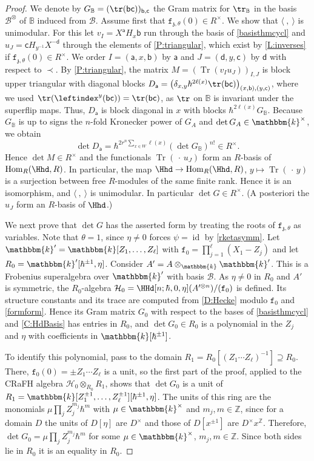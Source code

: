 \documentclass[a4paper,11pt]{amsart}
\let\<\langle
\let\>\rangle
\newcommand{\Tr}{\op{Tr}}
\newcommand\cB{\mathcal{B}}
\newcommand\cBo{\cB^{\otimes}}
\numberwithin{equation}{subsection}
\theoremstyle{definition}
\theoremstyle{theorem}
\theoremstyle{remark}
\newcommand\charge{{\mathfrak{z}}}
\newcommand\fct{\mathtt{f}_{\charge,\theta}}
\newcommand\Sym{W}
\newcommand\ba{\mathsf{a}}
\newcommand\bd{\mathsf{d}}
\newcommand\bb{\mathsf{b}}
\newcommand\bc{\mathsf{c}}
\newcommand\op{\operatorname}
\newcommand\kk{\mathbbm{k}}
\newcommand\Z{\mathbb{Z}}
\newcommand{\Bo}{\mathbb{B}}
\begin{document}
\begin{proof} We denote by $G_\Bo=(\tr(\bb\bc))_{\bb,\bc}$ the Gram matrix for $\tr_\Bo$ in the basis $\cBo$ of $\Bo$ induced from $\cB$.
Assume first that $\fct(0)\in R^{\times}$. We show that $\<\ ,\ \>$ is unimodular. For this let $v_I=X^{\ba}H_x\bb$ run
through the basis of \autoref{basisthmcycl} and $u_J=\bc H_{y^{-1}}X^{-\bd}$ through the elements
of \autoref{P:triangular}, which exist by \autoref{L:inverses} if $\fct(0)\in R^{\times}$. We order $I=(\ba,x,\bb)$ by $\ba$ and $J=(\bd,y,\bc)$ by
$\bd$ with respect to $\prec$. By \autoref{P:triangular}, the matrix $M=(\Tr(v_Iu_J))_{I,J}$ is block upper triangular with diagonal blocks
$D_{\ba}=\bigl(\delta_{x,y}\hbar^{2\ell(x)}\tr(\bb\bc)\bigr)_{(x,\bb),(y,\bc)}$, where we used $\tr(\leftindex^{y}(\bb\bc))=\tr(\bb\bc)$, as $\tr$ on $\Bo$ is invariant under the superflip maps. Thus,  $D_{\ba}$ is block diagonal in $x$ with blocks $\hbar^{2\ell(x)}G_\Bo$.  Because $G_\Bo$ is up to signs the $n$-fold Kronecker power of $G_A$ and $\det G_A\in\kk^{\times}$, we obtain
\[
\det D_{\ba}=\hbar^{2r^{n}\sum_{x\in\Sym}\ell(x)}(\det G_\Bo)^{n!}\in R^{\times}.
\]
Hence $\det M\in R^{\times}$ and the functionals $\Tr(\,\cdot\,u_J)$ form an $R$-basis of $\op{Hom}_R(\Hhd,R)$. In particular, the map $\Hhd\to\op{Hom}_R(\Hhd,R)$, $y\mapsto\Tr(\,\cdot\,y)$ is a surjection between free $R$-modules of the same finite rank. Hence it is an isomorphism, and $\<\ ,\ \>$ is unimodular.  In particular $\det G\in R^{\times}$. (A posteriori the $u_J$ form an $R$-basis of $\Hhd$.)

 We next prove that $\det G$ has the asserted form by treating the roots of $\fct$ as variables. Note that $\theta=1$, since $\eta\neq0$ forces $\psi=\op{id}$ by \autoref{rketasymm}. Let $\kk'=\kk[Z_1,\dots,Z_\ell]$ with $\mathtt f_0=\prod_{j=1}^{\ell}(X_1-Z_j)$ and let  $R_0=\kk'[\hbar^{\pm1},\eta]$. Consider  $A'=A\otimes_\kk\kk'$. This is a Frobenius superalgebra over $\kk'$ with basis $\cB$. As $\eta\not=0$ in $R_0$ and $A'$ is symmetric, the $R_0$-algebra $\mathcal H_0=\HHd[n;\hbar,0,\eta](A'^{\otimes n})/(\mathtt f_0)$ is defined. Its structure constants and its trace are computed from \autoref{D:Hecke} modulo $\mathtt f_0$ and \autoref{formform}. Hence its Gram matrix $G_0$ with respect to the bases of \autoref{basisthmcycl} and \autoref{C:HdBasis} has entries in $R_0$, and $\det G_0\in R_0$ is a polynomial in the $Z_j$ and $\eta$ with coefficients in $\kk[\hbar^{\pm1}]$.

To identify this polynomial, pass to the domain $R_1=R_0[(Z_1\cdots Z_\ell)^{-1}]\supseteq R_0$. There, $\mathtt f_0(0)=\pm Z_1\cdots Z_\ell$ is a unit, so the first part of the proof, applied to the CRaFH algebra $\mathcal H_0\otimes_{R_0}R_1$, shows that $\det G_0$ is a unit of $R_1=\kk[Z_1^{\pm1},\dots,Z_\ell^{\pm1}][\hbar^{\pm1},\eta]$. The units of this ring are the monomials $\mu\prod_jZ_j^{m_j}\hbar^{m}$ with $\mu\in\kk^{\times}$ and $m_j,m\in\Z$, since for a domain $D$ the units of $D[\eta]$ are $D^{\times}$ and those of $D[x^{\pm1}]$ are $D^{\times}x^{\Z}$. Therefore, $\det G_0=\mu\prod_jZ_j^{m_j}\hbar^{m}$ for some $\mu\in\kk^{\times}$, $m_j,m\in\Z$. Since both sides lie in $R_0$ it is an equality in $R_0$.


\end{proof}
\end{document}
